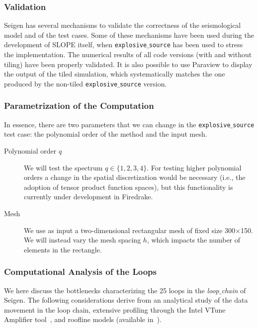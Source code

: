 \subsubsection{Validation}
Seigen has several mechanisms to validate the correctness of the seismological model and of the test cases. Some of these mechanisms have been used during the development of SLOPE itself, when {\tt explosive$\_$source} has been used to stress the implementation. The numerical results of all code versions (with and without tiling) have been properly validated. It is also possible to use Paraview to display the output of the tiled simulation, which systematically matches the one produced by the non-tiled {\tt explosive$\_$source} version.

\subsubsection{Parametrization of the Computation}
In essence, there are two parameters that we can change in the {\tt explosive$\_$source} test case: the polynomial order of the method and the input mesh. 

\begin{description}
\item[Polynomial order $q$] We will test the spectrum $q \in \lbrace 1, 2, 3, 4 \rbrace$. For testing higher polynomial orders a change in the spatial discretization would be necessary (i.e., the adoption of tensor product function spaces), but this functionality is currently under development in Firedrake.
\item[Mesh] We use as input a two-dimensional rectangular mesh of fixed size 300$\times$150. We will instead vary the mesh spacing $h$, which impacts the number of elements in the rectangle.
\end{description}  

\subsubsection{Computational Analysis of the Loops}
We here discuss the bottlenecks characterizing the 25 loops in the {\em loop$\_$chain} of Seigen. The following considerations derive from an analytical study of the data movement in the loop chain, extensive profiling through the Intel VTune Amplifier tool~\citep{vtune}, and roofline models (available in~\cite{Seigen-paper}).

